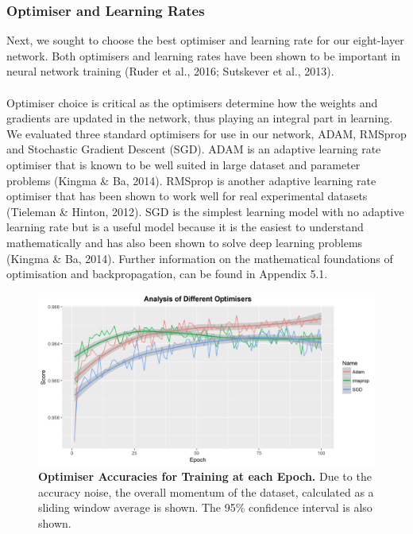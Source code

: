 \documentclass{article}
\begin{document}
\subsubsection{Optimiser and Learning Rates}
Next, we sought to choose the best optimiser and learning rate for our eight-layer network. Both optimisers and learning rates have been shown to be important in neural network training (Ruder et al., 2016; Sutskever et al., 2013).\\\\
Optimiser choice is critical as the optimisers determine how the weights and gradients are updated in the network, thus playing an integral part in learning. We evaluated three standard optimisers for use in our network, ADAM, RMSprop and Stochastic Gradient Descent (SGD). ADAM is an adaptive learning rate optimiser that is known to be well suited in large dataset and parameter problems (Kingma \& Ba, 2014). RMSprop is another adaptive learning rate optimiser that has been shown to work well for real experimental datasets (Tieleman \& Hinton, 2012). SGD is the simplest learning model with no adaptive learning rate but is a useful model because it is the easiest to understand mathematically and has also been shown to solve deep learning problems (Kingma \& Ba, 2014).  Further information on the mathematical foundations of optimisation and backpropagation, can be found in Appendix 5.1. 
\begin{figure}[H]
\includegraphics[width=\textwidth]{optimiserlearning.jpg}
\centering
\caption{\textbf{Optimiser Accuracies for Training at each Epoch.} Due to the accuracy noise, the overall momentum of the dataset, calculated as a sliding window average is shown. The 95\% confidence interval is also shown.}
\end{figure}
\end{document}

